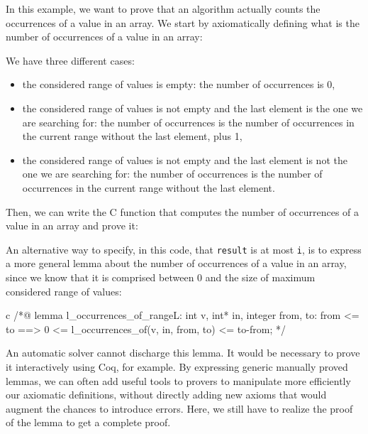 In this example, we want to prove that an algorithm actually counts the
occurrences of a value in an array. We start by axiomatically defining
what is the number of occurrences of a value in an array:






We have three different cases:
\begin{itemize}
\item
  the considered range of values is empty: the number of occurrences is
  0,
\item
  the considered range of values is not empty and the last element is
  the one we are searching for: the number of occurrences is the number of
  occurrences in the current range without the last element, plus 1,
\item
  the considered range of values is not empty and the last element is
  not the one we are searching for: the number of occurrences is the number
  of occurrences in the current range without the last element.
\end{itemize}
Then, we can write the C function that computes the number of
occurrences of a value in an array and prove it:






An alternative way to specify, in this code, that \texttt{result} is at
most \texttt{i}, is to express a more general lemma about the number of
occurrences of a value in an array, since we know that it is
comprised between 0 and the size of maximum considered range of values:



\begin{CodeBlock}{c}
/*@
lemma l_occurrences_of_range{L}:
  \forall int v, int* in, integer from, to:
    from <= to ==> 0 <= l_occurrences_of(v, in, from, to) <= to-from;
*/
\end{CodeBlock}



An automatic solver cannot discharge this lemma. It would be necessary
to prove it interactively using Coq, for example. By expressing generic
manually proved lemmas, we can often add useful tools to provers to
manipulate more efficiently our axiomatic definitions, without directly
adding new axioms that would augment the chances to introduce errors.
Here, we still have to realize the proof of the lemma to get a complete
proof.


